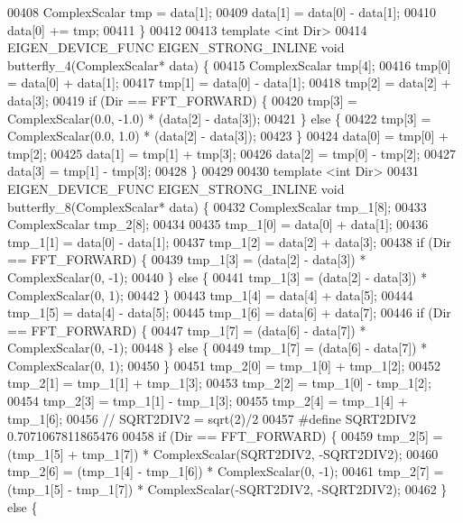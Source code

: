 \begin{DoxyCode}
00408     ComplexScalar tmp = data[1];
00409     data[1] = data[0] - data[1];
00410     data[0] += tmp;
00411   \}
00412 
00413   \textcolor{keyword}{template} <\textcolor{keywordtype}{int} Dir>
00414   EIGEN\_DEVICE\_FUNC EIGEN\_STRONG\_INLINE \textcolor{keywordtype}{void} butterfly\_4(ComplexScalar* data) \{
00415     ComplexScalar tmp[4];
00416     tmp[0] = data[0] + data[1];
00417     tmp[1] = data[0] - data[1];
00418     tmp[2] = data[2] + data[3];
00419     \textcolor{keywordflow}{if} (Dir == FFT\_FORWARD) \{
00420       tmp[3] = ComplexScalar(0.0, -1.0) * (data[2] - data[3]);
00421     \} \textcolor{keywordflow}{else} \{
00422       tmp[3] = ComplexScalar(0.0, 1.0) * (data[2] - data[3]);
00423     \}
00424     data[0] = tmp[0] + tmp[2];
00425     data[1] = tmp[1] + tmp[3];
00426     data[2] = tmp[0] - tmp[2];
00427     data[3] = tmp[1] - tmp[3];
00428   \}
00429 
00430   \textcolor{keyword}{template} <\textcolor{keywordtype}{int} Dir>
00431   EIGEN\_DEVICE\_FUNC EIGEN\_STRONG\_INLINE \textcolor{keywordtype}{void} butterfly\_8(ComplexScalar* data) \{
00432     ComplexScalar tmp\_1[8];
00433     ComplexScalar tmp\_2[8];
00434 
00435     tmp\_1[0] = data[0] + data[1];
00436     tmp\_1[1] = data[0] - data[1];
00437     tmp\_1[2] = data[2] + data[3];
00438     \textcolor{keywordflow}{if} (Dir == FFT\_FORWARD) \{
00439       tmp\_1[3] = (data[2] - data[3]) * ComplexScalar(0, -1);
00440     \} \textcolor{keywordflow}{else} \{
00441       tmp\_1[3] = (data[2] - data[3]) * ComplexScalar(0, 1);
00442     \}
00443     tmp\_1[4] = data[4] + data[5];
00444     tmp\_1[5] = data[4] - data[5];
00445     tmp\_1[6] = data[6] + data[7];
00446     \textcolor{keywordflow}{if} (Dir == FFT\_FORWARD) \{
00447       tmp\_1[7] = (data[6] - data[7]) * ComplexScalar(0, -1);
00448     \} \textcolor{keywordflow}{else} \{
00449       tmp\_1[7] = (data[6] - data[7]) * ComplexScalar(0, 1);
00450     \}
00451     tmp\_2[0] = tmp\_1[0] + tmp\_1[2];
00452     tmp\_2[1] = tmp\_1[1] + tmp\_1[3];
00453     tmp\_2[2] = tmp\_1[0] - tmp\_1[2];
00454     tmp\_2[3] = tmp\_1[1] - tmp\_1[3];
00455     tmp\_2[4] = tmp\_1[4] + tmp\_1[6];
00456 \textcolor{comment}{// SQRT2DIV2 = sqrt(2)/2}
00457 \textcolor{preprocessor}{#define SQRT2DIV2 0.7071067811865476}
00458     \textcolor{keywordflow}{if} (Dir == FFT\_FORWARD) \{
00459       tmp\_2[5] = (tmp\_1[5] + tmp\_1[7]) * ComplexScalar(SQRT2DIV2, -SQRT2DIV2);
00460       tmp\_2[6] = (tmp\_1[4] - tmp\_1[6]) * ComplexScalar(0, -1);
00461       tmp\_2[7] = (tmp\_1[5] - tmp\_1[7]) * ComplexScalar(-SQRT2DIV2, -SQRT2DIV2);
00462     \} \textcolor{keywordflow}{else} \{

\end{DoxyCode}
